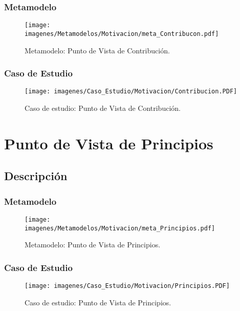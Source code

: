 \subsubsection{Metamodelo}
\begin{figure}[H]
	\centering
	\texttt{[image: imagenes/Metamodelos/Motivacion/meta\_Contribucon.pdf]}
	\caption{Metamodelo: Punto de Vista de Contribución.}
	\label{fig:gap_analysis}
\end{figure}

\subsubsection{Caso de Estudio}


\begin{figure}[H]
	\centering
	\texttt{[image: imagenes/Caso\_Estudio/Motivacion/Contribucion.PDF]}
	\caption{Caso de estudio: Punto de Vista de Contribución.}
	\label{fig:gap_analysis}
\end{figure}

\section{Punto de Vista de Principios}
\subsection{Descripción}

\subsubsection{Metamodelo}
\begin{figure}[H]
	\centering
	\texttt{[image: imagenes/Metamodelos/Motivacion/meta\_Principios.pdf]}
	\caption{Metamodelo: Punto de Vista de Principios.}
	\label{fig:gap_analysis}
\end{figure}

\subsubsection{Caso de Estudio}


\begin{figure}[H]
	\centering
	\texttt{[image: imagenes/Caso\_Estudio/Motivacion/Principios.PDF]}
	\caption{Caso de estudio: Punto de Vista de Principios.}
	\label{fig:gap_analysis}
\end{figure}

